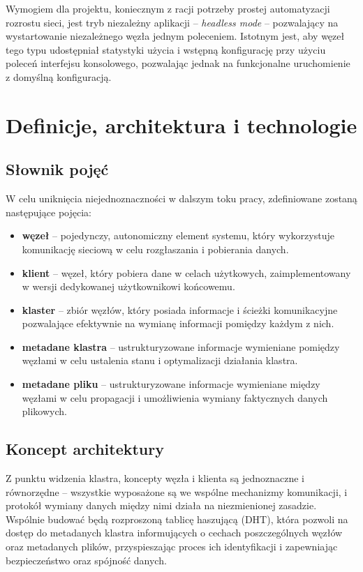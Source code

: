 Wymogiem dla projektu, koniecznym z racji potrzeby prostej automatyzacji rozrostu sieci, jest tryb niezależny aplikacji -- {\em headless mode} -- pozwalający na wystartowanie niezależnego węzła jednym poleceniem. Istotnym jest, aby węzeł tego typu udostępniał statystyki użycia i wstępną konfigurację przy użyciu poleceń interfejsu konsolowego, pozwalając jednak na funkcjonalne uruchomienie z domyślną konfiguracją.


\section{Definicje, architektura i technologie}
\label{sec:zalozeniaProjektu}

\subsection{Słownik pojęć}

W celu uniknięcia niejednoznaczności w dalszym toku pracy, zdefiniowane zostaną następujące pojęcia:

\begin{itemize}
    \item \textbf{węzeł} -- pojedynczy, autonomiczny element systemu, który wykorzystuje komunikację sieciową w celu rozgłaszania i pobierania danych.
    \item \textbf{klient} -- węzeł, który pobiera dane w celach użytkowych, zaimplementowany w wersji dedykowanej użytkownikowi końcowemu.
    \item \textbf{klaster} -- zbiór węzłów, który posiada informacje i ścieżki komunikacyjne pozwalające efektywnie na wymianę informacji pomiędzy każdym z nich.
    \item \textbf{metadane klastra} -- ustrukturyzowane informacje wymieniane pomiędzy węzłami w celu ustalenia stanu i optymalizacji działania klastra.
    \item \textbf{metadane pliku} -- ustrukturyzowane informacje wymieniane między węzłami w celu propagacji i umożliwienia wymiany faktycznych danych plikowych.
\end{itemize}


\subsection{Koncept architektury}

Z punktu widzenia klastra, koncepty węzła i klienta są jednoznaczne i równorzędne -- wszystkie wyposażone są we wspólne mechanizmy komunikacji, i protokół wymiany danych między nimi działa na niezmienionej zasadzie. Wspólnie budować będą rozproszoną tablicę haszującą (DHT), która pozwoli na dostęp do metadanych klastra informujących o cechach poszczególnych węzłów oraz metadanych plików, przyspieszając proces ich identyfikacji i zapewniając bezpieczeństwo oraz spójność danych.

